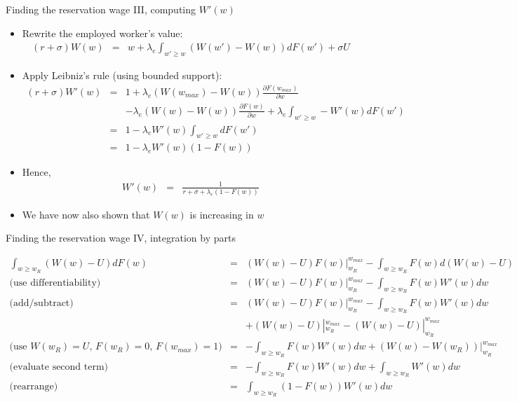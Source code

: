 \documentclass[9pt]{beamer}
\newcommand{\bit}{\begin{itemize}}
\newcommand{\eit}{\end{itemize}}
\newcommand{\lb}{\label}
\begin{document}
\begin{frame}{Finding the reservation wage III, computing $W'(w)$}

\bit
\setlength\itemsep{1.5em}

\item Rewrite the employed worker's value:
\begin{eqnarray}
(r+\sigma)W(w)  &=&  w + \lambda_e  \int_{w' \geq w} (W(w') - W(w)) dF(w') + \sigma U \nonumber
\end{eqnarray}

\item Apply Leibniz's rule (using bounded support):
\begin{eqnarray}
(r+\sigma)W'(w) &=& 1 + \lambda_e(W(w_{max}) - W(w)) \frac{\partial F(w_{max})}{\partial w}  \nonumber \\
&& - \lambda_e(W(w) - W(w)) \frac{\partial F(w)}{\partial w} + \lambda_e  \int_{w' \geq w} - W'(w) dF(w') \nonumber \\
&=& 1 -\lambda_e W'(w) \int_{w' \geq w} dF(w') \nonumber \\
&=& 1 -\lambda_e W'(w) (1-F(w)) \nonumber
\end{eqnarray}

\item Hence,
\begin{eqnarray}
\lb{e_derivative}
W'(w) &=& \frac{1}{r+\sigma + \lambda_e(1-F(w))}
\end{eqnarray}

\item We have now also shown that $W(w)$ is increasing in $w$

\eit

\end{frame}

\begin{frame}{Finding the reservation wage IV, integration by parts}


\footnotesize
\begin{eqnarray}
\int_{w \geq w_R} (W(w)-U) dF(w)   &=& (W(w)-U) F(w)|_{w_R}^{w_{max}} - \int_{w \geq w_R} F(w) d(W(w)-U) \nonumber \\
\text{(use differentiability)} &=& (W(w)-U) F(w)|_{w_R}^{w_{max}} - \int_{w \geq w_R} F(w) W'(w)dw    \nonumber \\ 
\text{(add/subtract)} &=& (W(w)-U) F(w)|_{w_R}^{w_{max}}- \int_{w \geq w_R} F(w) W'(w)dw    \nonumber \\ 
&& + (W(w)-U) |_{w_R}^{w_{max}} - (W(w)-U) |_{w_R}^{w_{max}}\nonumber \\
\text{(use $W(w_R) = U$, $F(w_R)=0$, $F(w_{max})=1$)} &=&  - \int_{w \geq w_R} F(w) W'(w)dw + (W(w)-W(w_R)) |_{w_R}^{w_{max}} \nonumber \\
\text{(evaluate second term)} &=&  - \int_{w \geq w_R} F(w) W'(w)dw + \int_{w \geq w_R} W'(w)dw \nonumber \\
\lb{integration}
\text{(rearrange)} &=& \int_{w \geq w_R} (1-F(w)) W'(w)dw 
\end{eqnarray}
\normalsize

\end{frame}
\end{document}
